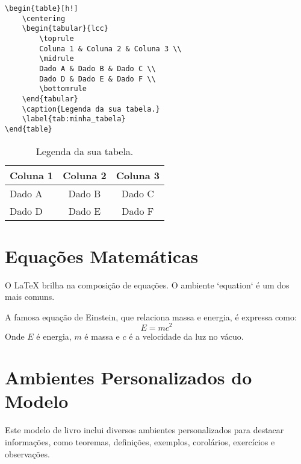 \begin{verbatim}
\begin{table}[h!]
    \centering
    \begin{tabular}{lcc}
        \toprule
        Coluna 1 & Coluna 2 & Coluna 3 \\
        \midrule
        Dado A & Dado B & Dado C \\
        Dado D & Dado E & Dado F \\
        \bottomrule
    \end{tabular}
    \caption{Legenda da sua tabela.}
    \label{tab:minha_tabela}
\end{table}
\end{verbatim}
\begin{table}[h!]
    \centering
    \begin{tabular}{lcc}
        \toprule
        Coluna 1 & Coluna 2 & Coluna 3 \\
        \midrule
        Dado A & Dado B & Dado C \\
        Dado D & Dado E & Dado F \\
        \bottomrule
    \end{tabular}
    \caption{Legenda da sua tabela.}
    \label{tab:minha_tabela}
\end{table}

\section{Equações Matemáticas}

O LaTeX brilha na composição de equações. O ambiente `equation` é um dos mais comuns.

\begin{teo}
A famosa equação de Einstein, que relaciona massa e energia, é expressa como:
\begin{equation}
E = mc^2 \label{eq:einstein}
\end{equation}
Onde $E$ é energia, $m$ é massa e $c$ é a velocidade da luz no vácuo.
\end{teo}

\section{Ambientes Personalizados do Modelo}

Este modelo de livro inclui diversos ambientes personalizados para destacar informações, como teoremas, definições, exemplos, corolários, exercícios e observações.

